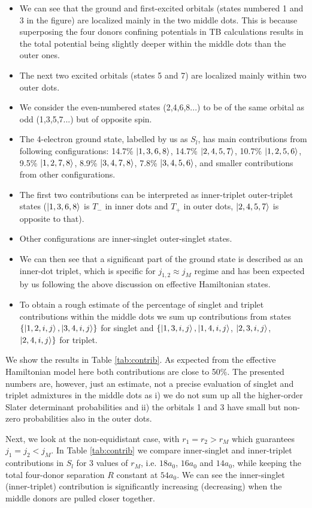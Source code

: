 \begin{itemize}
    \item 
We can see that the ground and first-excited orbitals (states numbered 1 and 3 in the figure) are localized mainly in the two middle dots. This is because superposing the four donors confining potentials in TB calculations results in the total potential being slightly deeper within the middle dots than the outer ones. 
    \item 
The next two excited orbitals (states 5 and 7) are localized mainly within two outer dots. 
    \item
We consider the even-numbered states (2,4,6,8...) to be of the same orbital as odd (1,3,5,7...) but of opposite spin. 
    \item
The 4-electron ground state, labelled by us as $S_l$, has main contributions from following configurations: 14.7\% $\ket{1,3,6,8}$, 14.7\% $\ket{2,4,5,7}$, 10.7\% $\ket{1,2,5,6}$, 9.5\% $\ket{1,2,7,8}$, 8.9\% $\ket{3,4,7,8}$, 7.8\% $\ket{3,4,5,6}$, and smaller contributions from other configurations.
    \item
The first two contributions can be interpreted as inner-triplet outer-triplet states ($\ket{1,3,6,8}$ is $T_-$ in inner dots and $T_+$ in outer dots,  $\ket{2,4,5,7}$ is opposite to that). 
    \item
Other configurations are inner-singlet outer-singlet states. 
    \item
We can then see that a significant part of the ground state is described as an inner-dot triplet, which is specific for $j_{1,2}\approx j_M$ regime and has been expected by us following the above discussion on effective Hamiltonian states. 
    \item
To obtain a rough estimate of the percentage of singlet and triplet contributions within the middle dots we sum up contributions from states 
$\{\ket{1,2,i,j},\ket{3,4,i,j}\}$ 
for singlet and $\{\ket{1,3,i,j},\ket{1,4,i,j}$,
$\ket{2,3,i,j}$,
$\ket{2,4,i,j}\}$ for triplet. 
\end{itemize}
We show the results in Table \ref{tab:contrib}. As expected from the effective Hamiltonian model here both contributions are close to 50\%. The presented numbers are, however, just an estimate, not a precise evaluation of singlet and triplet admixtures in the middle dots as i) we do not sum up all the higher-order Slater determinant probabilities and ii) the orbitals 1 and 3 have small but non-zero probabilities also in the outer dots.


Next, we look at the non-equidistant case, with $r_1=r_2>r_M$ which guarantees $j_1=j_2<j_M$. In Table \ref{tab:contrib} we compare inner-singlet and inner-triplet contributions in $S_l$ for 3 values of $r_M$, i.e. $18a_0$, $16a_0$ and $14a_0$, while keeping the total four-donor separation $R$ constant at $54a_0$. We can see the inner-singlet (inner-triplet) contribution is significantly increasing (decreasing) when the middle donors are pulled closer together.  


